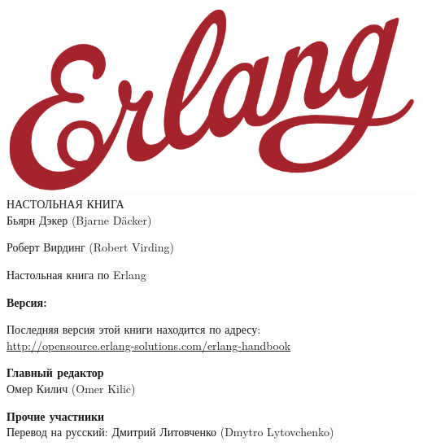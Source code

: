 \documentclass[russian,14pt,oneside]{book}
\begin{document}
\begin{titlepage}
\centering

\vspace*{70pt}
\includegraphics[scale=0.3]{includes/erlang-logo.png}\\[0.8\baselineskip]
{\Huge \sffamily НАСТОЛЬНАЯ КНИГА}\\
\vspace{250pt}
{\LARGE Бьярн Дэкер (Bjarne D\"acker)}\par
{\LARGE Роберт Вирдинг (Robert Virding)}\par

\end{titlepage}


\clearpage
\thispagestyle{empty}
{\Huge Настольная книга по Erlang}\\[0.1\baselineskip]

\vspace{10pt}
{\Large \textbf{Версия:}\\[0.2\baselineskip]
\immediate{}

\immediate{}
}

\vspace{10pt}
{\large Последняя версия этой книги находится по адресу:\\
\url{http://opensource.erlang-solutions.com/erlang-handbook}}

\vfill

\textbf{Главный редактор}\\[0.1\baselineskip]
Омер Килич (Omer Kilic)

\textbf{Прочие участники}\\[0.1\baselineskip]
Перевод на русский: Дмитрий Литовченко (Dmytro Lytovchenko)
\end{document}
